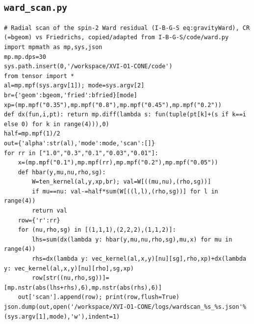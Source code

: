 \documentclass[10pt]{article}
\begin{document}
\subsection{\texttt{ward\_scan.py}}
\begin{lstlisting}
# Radial scan of the spin-2 Ward residual (I-B-G-S eq:gravityWard), CR (=bgeom) vs Friedrichs, copied/adapted from I-B-G-S/code/ward.py
import mpmath as mp,sys,json
mp.mp.dps=30
sys.path.insert(0,'/workspace/XVI-O1-CONE/code')
from tensor import *
al=mp.mpf(sys.argv[1]); mode=sys.argv[2]
br={'geom':bgeom,'fried':bfried}[mode]
xp=(mp.mpf("0.35"),mp.mpf("0.8"),mp.mpf("0.45"),mp.mpf("0.2"))
def dx(fun,i,pt): return mp.diff(lambda s: fun(tuple(pt[k]+(s if k==i else 0) for k in range(4))),0)
half=mp.mpf(1)/2
out={'alpha':str(al),'mode':mode,'scan':[]}
for rr in ["1.0","0.3","0.1","0.03","0.01"]:
    x=(mp.mpf("0.1"),mp.mpf(rr),mp.mpf("0.2"),mp.mpf("0.05"))
    def hbar(y,mu,nu,rho,sg):
        W=ten_kernel(al,y,xp,br); val=W[((mu,nu),(rho,sg))]
        if mu==nu: val-=half*sum(W[((l,l),(rho,sg))] for l in range(4))
        return val
    row={'r':rr}
    for (nu,rho,sg) in [(1,1,1),(2,2,2),(1,1,2)]:
        lhs=sum(dx(lambda y: hbar(y,mu,nu,rho,sg),mu,x) for mu in range(4))
        rhs=dx(lambda y: vec_kernel(al,x,y)[nu][sg],rho,xp)+dx(lambda y: vec_kernel(al,x,y)[nu][rho],sg,xp)
        row[str((nu,rho,sg))]=[mp.nstr(abs(lhs+rhs),6),mp.nstr(abs(rhs),6)]
    out['scan'].append(row); print(row,flush=True)
json.dump(out,open('/workspace/XVI-O1-CONE/logs/wardscan_%s_%s.json'%(sys.argv[1],mode),'w'),indent=1)
\end{lstlisting}
\end{document}

